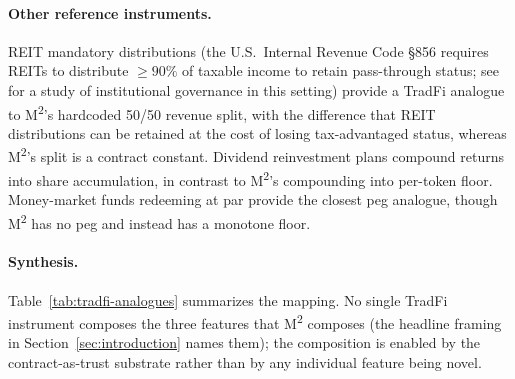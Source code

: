 \paragraph{Other reference instruments.} REIT mandatory distributions (the U.S.\ Internal Revenue Code \S856 requires REITs to distribute $\geq 90\%$ of taxable income to retain pass-through status; see \citet{Hartzell2014} for a study of institutional governance in this setting) provide a TradFi analogue to M\textsuperscript{2}'s hardcoded 50/50 revenue split, with the difference that REIT distributions can be retained at the cost of losing tax-advantaged status, whereas M\textsuperscript{2}'s split is a contract constant. Dividend reinvestment plans \citep{ScholesWolfson1989} compound returns into share accumulation, in contrast to M\textsuperscript{2}'s compounding into per-token floor. Money-market funds redeeming at par \citep{KacperczykSchnabl2013} provide the closest peg analogue, though M\textsuperscript{2} has no peg and instead has a monotone floor.

\paragraph{Synthesis.} Table~\ref{tab:tradfi-analogues} summarizes the mapping. No single TradFi instrument composes the three features that M\textsuperscript{2} composes (the headline framing in Section~\ref{sec:introduction} names them); the composition is enabled by the contract-as-trust substrate rather than by any individual feature being novel.

